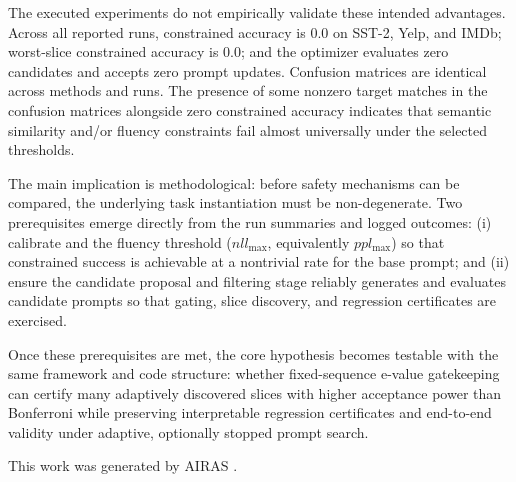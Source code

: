 \documentclass{article} %
\begin{document}
The executed experiments do not empirically validate these intended advantages. Across all reported runs, constrained accuracy is 0.0 on SST-2, Yelp, and IMDb; worst-slice constrained accuracy is 0.0; and the optimizer evaluates zero candidates and accepts zero prompt updates. Confusion matrices are identical across methods and runs. The presence of some nonzero target matches in the confusion matrices alongside zero constrained accuracy indicates that semantic similarity and/or fluency constraints fail almost universally under the selected thresholds.

The main implication is methodological: before safety mechanisms can be compared, the underlying task instantiation must be non-degenerate. Two prerequisites emerge directly from the run summaries and logged outcomes: (i) calibrate  and the fluency threshold ($nll_{\max}$, equivalently $ppl_{\max}$) so that constrained success is achievable at a nontrivial rate for the base prompt; and (ii) ensure the candidate proposal and filtering stage reliably generates and evaluates candidate prompts so that gating, slice discovery, and regression certificates are exercised.

Once these prerequisites are met, the core hypothesis becomes testable with the same framework and code structure: whether fixed-sequence e-value gatekeeping can certify many adaptively discovered slices with higher acceptance power than Bonferroni while preserving interpretable regression certificates and end-to-end validity under adaptive, optionally stopped prompt search.

This work was generated by \textsc{AIRAS} \citep{airas2025}.



\end{document}
